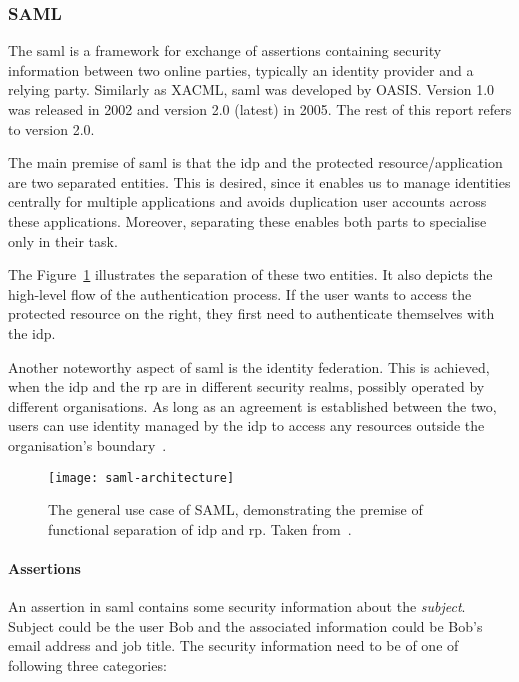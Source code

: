 \subsubsection{SAML}\label{sec:saml}

The \acrfull{saml} is a framework for exchange of assertions containing security information between two online parties, typically an identity provider and a relying party. Similarly as XACML, \acrshort{saml} was developed by OASIS. Version 1.0 was released in 2002 and version 2.0 (latest) in 2005. The rest of this report refers to version 2.0.

The main premise of \acrshort{saml} is that the \acrfull{idp} and the protected resource/application are two separated entities. This is desired, since it enables us to manage identities centrally for multiple applications and avoids duplication user accounts across these applications. Moreover, separating these enables both parts to specialise only in their task.

The Figure~\ref{fig:saml-architectire} illustrates the separation of these two entities. It also depicts the high-level flow of the authentication process. If the user wants to access the protected resource on the right, they first need to authenticate themselves with the \acrshort{idp}.

Another noteworthy aspect of \acrshort{saml} is the identity federation. This is achieved, when the \acrshort{idp} and the \acrshort{rp} are in different security realms, possibly operated by different organisations. As long as an agreement is established between the two, users can use identity managed by the \acrshort{idp} to access any resources outside the organisation's boundary~\cite{2008SecurityOverview}.

 \begin{figure}[ht]
    \centering
    \texttt{[image: saml-architecture]}
    \caption{The general use case of SAML, demonstrating the premise of functional separation of \acrshort{idp} and \acrshort{rp}. Taken from~\cite{2008SecurityOverview}.}
    \label{fig:saml-architectire}
\end{figure}

\paragraph{Assertions}
An assertion in \acrshort{saml} contains some security information about the \textit{subject}. Subject could be the user Bob and the associated information could be Bob's email address and job title. The security information need to be of one of following three categories:

